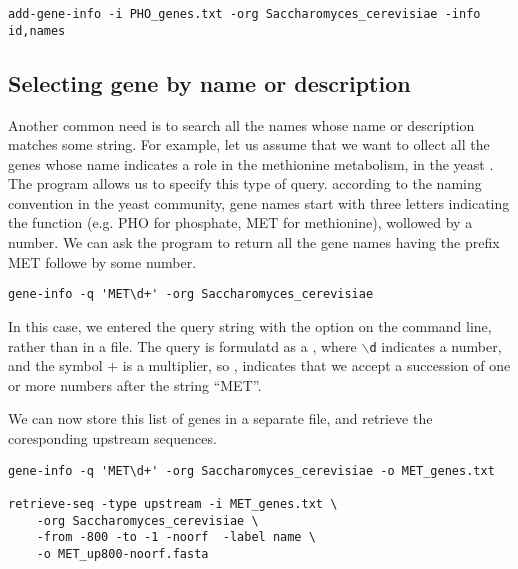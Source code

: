 {\color{Blue} \begin{footnotesize}
\begin{verbatim}
add-gene-info -i PHO_genes.txt -org Saccharomyces_cerevisiae -info id,names
\end{verbatim} \end{footnotesize}
}

\subsection{Selecting gene by name or description}

Another common need is to search all the names whose name or
description matches some string. For example, let us assume that we
want to ollect all the genes whose name indicates a role in the
methionine metabolism, in the yeast .
The program  allows us to specify this type of
query. according to the naming convention in the yeast community, gene
names start with three letters indicating the function (e.g. PHO for
phosphate, MET for methionine), wollowed by a number. We can ask the
program to return all the gene names having the prefix MET followe by
some number.

{\color{Blue} \begin{footnotesize}
\begin{verbatim}
gene-info -q 'MET\d+' -org Saccharomyces_cerevisiae
\end{verbatim} \end{footnotesize}
}

In this case, we entered the query string with the option 
on the command line, rather than in a file. The query is formulatd as
a , where \texttt{$\backslash$d} indicates
a number, and the symbol $+$ is a multiplier, so
, indicates that we accept a succession of one
or more numbers after the string ``MET''.

We can now store this list of genes in a separate file, and retrieve
the coresponding upstream sequences.


{\color{Blue} \begin{footnotesize}
\begin{verbatim}
gene-info -q 'MET\d+' -org Saccharomyces_cerevisiae -o MET_genes.txt

retrieve-seq -type upstream -i MET_genes.txt \
    -org Saccharomyces_cerevisiae \
    -from -800 -to -1 -noorf  -label name \
    -o MET_up800-noorf.fasta
\end{verbatim} \end{footnotesize}
}


